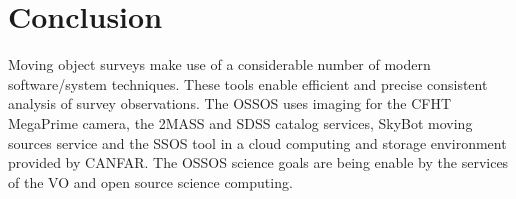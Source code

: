 \section{Conclusion}

Moving object surveys make use of a considerable number of modern software/system techniques. These tools enable efficient and precise consistent analysis of survey observations. The OSSOS uses  imaging for the CFHT MegaPrime camera, the 2MASS and SDSS catalog services, SkyBot moving sources service and the SSOS tool in a  cloud computing and storage environment provided by CANFAR. The OSSOS science goals are being enable by the services of the VO and open source science computing.


